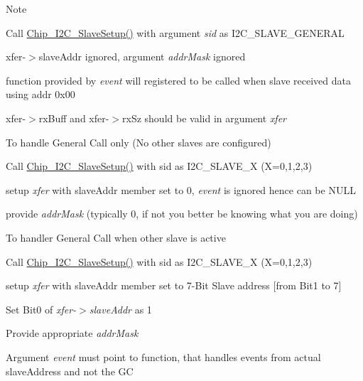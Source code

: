 \begin{DoxyNote}{Note}
\begin{DoxyItemize}
\item Call \hyperlink{group__I2C__17XX__40XX_gaf6ea40668dde26e406f76ff3ddeda527}{Chip\+\_\+\+I2\+C\+\_\+\+Slave\+Setup()} with argument {\itshape sid} as I2\+C\+\_\+\+S\+L\+A\+V\+E\+\_\+\+G\+E\+N\+E\+R\+AL
\begin{DoxyItemize}
\item xfer-\/$>$slave\+Addr ignored, argument {\itshape addr\+Mask} ignored
\item function provided by {\itshape event} will registered to be called when slave received data using addr 0x00
\item xfer-\/$>$rx\+Buff and xfer-\/$>$rx\+Sz should be valid in argument {\itshape xfer} 
\end{DoxyItemize}
\item To handle General Call only (No other slaves are configured)
\begin{DoxyItemize}
\item Call \hyperlink{group__I2C__17XX__40XX_gaf6ea40668dde26e406f76ff3ddeda527}{Chip\+\_\+\+I2\+C\+\_\+\+Slave\+Setup()} with sid as I2\+C\+\_\+\+S\+L\+A\+V\+E\+\_\+X (X=0,1,2,3)
\item setup {\itshape xfer} with slave\+Addr member set to 0, {\itshape event} is ignored hence can be N\+U\+LL
\item provide {\itshape addr\+Mask} (typically 0, if not you better be knowing what you are doing)
\end{DoxyItemize}
\item To handler General Call when other slave is active
\begin{DoxyItemize}
\item Call \hyperlink{group__I2C__17XX__40XX_gaf6ea40668dde26e406f76ff3ddeda527}{Chip\+\_\+\+I2\+C\+\_\+\+Slave\+Setup()} with sid as I2\+C\+\_\+\+S\+L\+A\+V\+E\+\_\+X (X=0,1,2,3)
\item setup {\itshape xfer} with slave\+Addr member set to 7-\/\+Bit Slave address \mbox{[}from Bit1 to 7\mbox{]}
\item Set Bit0 of {\itshape xfer-\/$>$slave\+Addr} as 1
\item Provide appropriate {\itshape addr\+Mask} 
\item Argument {\itshape event} must point to function, that handles events from actual slave\+Address and not the GC 
\end{DoxyItemize}
\end{DoxyItemize}
\end{DoxyNote}
